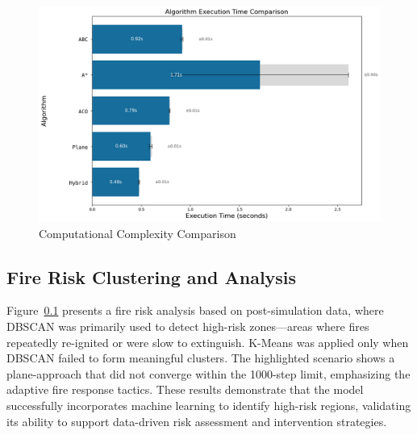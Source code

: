 \documentclass[11pt, a4paper]{article}
\begin{document}
\begin{figure}[!htbp]
    \centering
    \includegraphics[width=1\linewidth]{figures/computational.jpg}
    \caption{Computational Complexity Comparison}
    \label{fig:computational_complexity_comparison}
\end{figure}

\subsection{Fire Risk Clustering and Analysis}
\label{sec:risk_assesment}

Figure~\ref{sec:risk_assesment} presents a fire risk analysis based on post-simulation data, where DBSCAN was primarily used to detect high-risk zones—areas where fires repeatedly re-ignited or were slow to extinguish. K-Means was applied only when DBSCAN failed to form meaningful clusters. The highlighted scenario shows a plane-approach that did not converge within the 1000-step limit, emphasizing the adaptive fire response tactics. These results demonstrate that the model successfully incorporates machine learning to identify high-risk  regions, validating its ability to support data-driven risk assessment and intervention strategies. 
\end{document}
